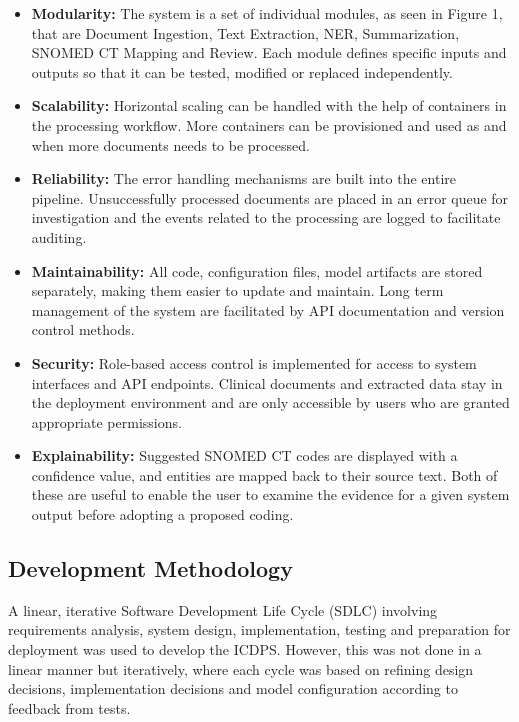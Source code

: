 \begin{itemize}

\item \textbf{Modularity:} The system is a set of individual modules, as seen in Figure 1, that are Document Ingestion, Text Extraction, NER, Summarization, SNOMED CT Mapping and Review. Each module defines specific inputs and outputs so that it can be tested, modified or replaced independently.

\item \textbf{Scalability:} Horizontal scaling can be handled with the help of containers in the processing workflow. More containers can be provisioned and used as and when more documents needs to be processed.

\item \textbf{Reliability:} The error handling mechanisms are built into the entire pipeline. Unsuccessfully processed documents are placed in an error queue for investigation and the events related to the processing are logged to facilitate auditing.

\item \textbf{Maintainability:} All code, configuration files, model artifacts are stored separately, making them easier to update and maintain. Long term management of the system are facilitated by API documentation and version control methods.

\item \textbf{Security:} Role-based access control is implemented for access to system interfaces and API endpoints. Clinical documents and extracted data stay in the deployment environment and are only accessible by users who are granted appropriate permissions.

\item \textbf{Explainability:} Suggested SNOMED CT codes are displayed with a confidence value, and entities are mapped back to their source text. Both of these are useful to enable the user to examine the evidence for a given system output before adopting a proposed coding.

\end{itemize}

\subsection{Development Methodology}

A linear, iterative Software Development Life Cycle (SDLC) involving requirements analysis, system design, implementation, testing and preparation for deployment was used to develop the ICDPS. However, this was not done in a linear manner but iteratively, where each cycle was based on refining design decisions, implementation decisions and model configuration according to feedback from tests.

